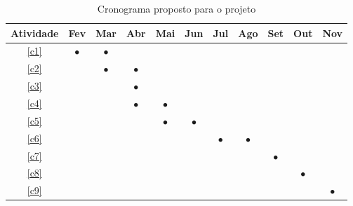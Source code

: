 \begin{table}[h]

\renewcommand{\arraystretch}{1}
\setlength\tabcolsep{3pt}
\begin{center}
\begin{tabular}{| c | c | c | c | c | c | c | c | c | c | c |}
\hline

Atividade &Fev &Mar &Abr &Mai &Jun &Jul &Ago &Set &Out &Nov \\ \hline \hline
\ref{c1}   &$\bullet$ &$\bullet$ & & & & & & & & \\ \hline
\ref{c2}   & &$\bullet$ &$\bullet$ & & & & & & & \\ \hline
\ref{c3}   & & &$\bullet$ & & & & & & & \\ \hline
\ref{c4}   & & &$\bullet$ &$\bullet$ & & & & & & \\ \hline
\ref{c5}   & & & &$\bullet$ &$\bullet$ & & & & & \\ \hline
\ref{c6}   & & & & & &$\bullet$ &$\bullet$ & & & \\ \hline
\ref{c7}   & & & & & & & &$\bullet$ & & \\ \hline
\ref{c8}   & & & & & & & & &$\bullet$ & \\ \hline
\ref{c9}   & & & & & & & & & &$\bullet$ \\ 
\hline
\end{tabular}
\end{center}
\caption{Cronograma proposto para o projeto}
\label{tab:cronograma}
\end{table}
